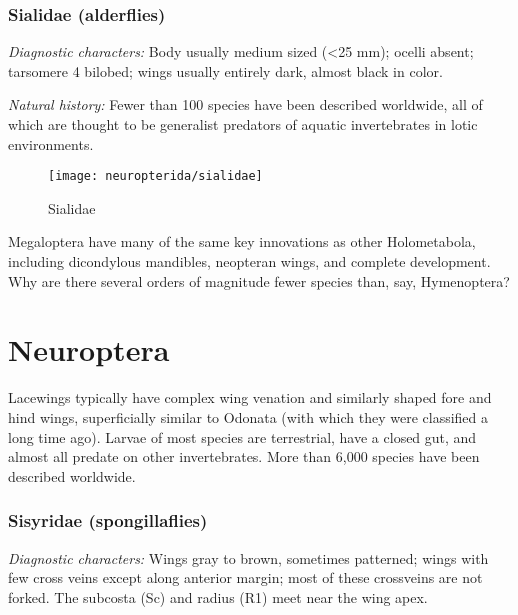 \subsubsection{Sialidae (alderflies)}
\noindent{}\textit{Diagnostic characters:} Body usually medium sized (\textless25 mm); ocelli absent; tarsomere 4 bilobed; wings usually entirely dark, almost black in color.\vspace{3mm}

\noindent{}\textit{Natural history:} Fewer than 100 species have been described worldwide, all of which are thought to be generalist predators of aquatic invertebrates in lotic environments.\vspace{3mm}

\begin{figure}[ht!]
  \centering
    \texttt{[image: neuropterida/sialidae]}
  \caption{Sialidae \citep[modified from Fig. 286 in][]{bhlitem56570}}
  \label{fig:sialid1}
\end{figure}

\begin{theo}
{}Megaloptera have many of the same key innovations as other Holometabola, including dicondylous mandibles, neopteran wings, and complete development. Why are there several orders of magnitude fewer species than, say, Hymenoptera?
\end{theo}

\section{Neuroptera}
Lacewings typically have complex wing venation and similarly shaped fore and hind wings, superficially similar to Odonata (with which they were classified a long time ago). Larvae of most species are terrestrial, have a closed gut, and almost all predate on other invertebrates. More than 6,000 species have been described worldwide.\vspace{3mm}

\subsubsection{Sisyridae (spongillaflies)}
\noindent{}\textit{Diagnostic characters:} Wings gray to brown, sometimes patterned; wings with few cross veins except along anterior margin; most of these crossveins are not forked. The subcosta (Sc) and radius (R1) meet near the wing apex.\vspace{3mm}

